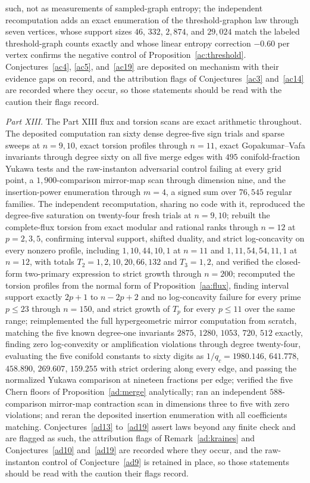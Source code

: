 \documentclass[11pt]{article}
\theoremstyle{definition}
\begin{document}
such, not as measurements of sampled-graph entropy; the independent recomputation adds an exact enumeration of the threshold-graphon law through seven vertices, whose support sizes $46$, $332$, $2{,}874$, and $29{,}024$ match the labeled threshold-graph counts exactly and whose linear entropy correction $-0.60$ per vertex confirms the negative control of Proposition~\ref{ac:threshold}.  Conjectures~\ref{ac4}, \ref{ac5}, and~\ref{ac19} are deposited on mechanism with their evidence gaps on record, and the attribution flags of Conjectures~\ref{ac3} and~\ref{ac14} are recorded where they occur, so those statements should be read with the caution their flags record.

\emph{Part XIII.}  The Part XIII flux and torsion scans are exact arithmetic throughout.  The deposited computation ran sixty dense degree-five sign trials and sparse sweeps at $n=9,10$, exact torsion profiles through $n=11$, exact Gopakumar--Vafa invariants through degree sixty on all five merge edges with $495$ conifold-fraction Yukawa tests and the raw-instanton adversarial control failing at every grid point, a $1{,}900$-comparison mirror-map scan through dimension nine, and the insertion-power enumeration through $m=4$, a signed sum over $76{,}545$ regular families.  The independent recomputation, sharing no code with it, reproduced the degree-five saturation on twenty-four fresh trials at $n=9,10$; rebuilt the complete-flux torsion from exact modular and rational ranks through $n=12$ at $p=2,3,5$, confirming interval support, shifted duality, and strict log-concavity on every nonzero profile, including $1,10,44,10,1$ at $n=11$ and $1,11,54,54,11,1$ at $n=12$, with totals $T_2=1,2,10,20,66,132$ and $T_3=1,2$, and verified the closed-form two-primary expression to strict growth through $n=200$; recomputed the torsion profiles from the normal form of Proposition~\ref{aa:flux}, finding interval support exactly $2p+1$ to $n-2p+2$ and no log-concavity failure for every prime $p\le23$ through $n=150$, and strict growth of $T_p$ for every $p\le11$ over the same range; reimplemented the full hypergeometric mirror computation from scratch, matching the five known degree-one invariants $2875$, $1280$, $1053$, $720$, $512$ exactly, finding zero log-convexity or amplification violations through degree twenty-four, evaluating the five conifold constants to sixty digits as $1/q_c=1980.146$, $641.778$, $458.890$, $269.607$, $159.255$ with strict ordering along every edge, and passing the normalized Yukawa comparison at nineteen fractions per edge; verified the five Chern floors of Proposition~\ref{ad:merge} analytically; ran an independent $588$-comparison mirror-map contraction scan in dimensions three to five with zero violations; and reran the deposited insertion enumeration with all coefficients matching.  Conjectures~\ref{ad13} to~\ref{ad19} assert laws beyond any finite check and are flagged as such, the attribution flags of Remark~\ref{ad:kraines} and Conjectures~\ref{ad10} and~\ref{ad19} are recorded where they occur, and the raw-instanton control of Conjecture~\ref{ad9} is retained in place, so those statements should be read with the caution their flags record.
\end{document}
